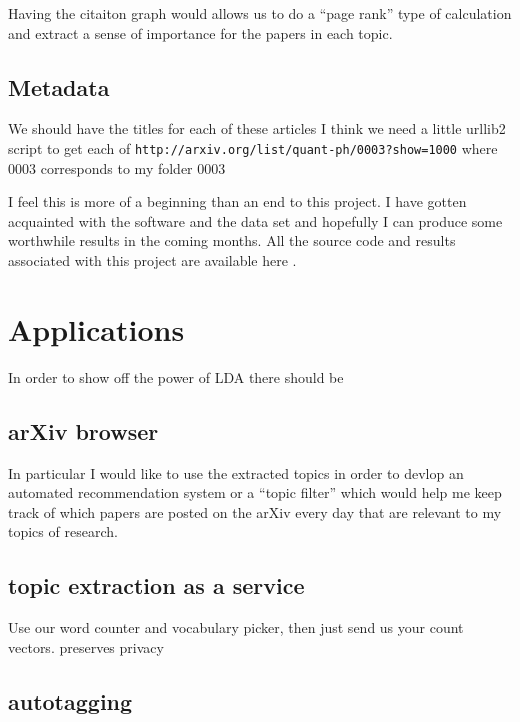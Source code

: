 \documentclass[letterpaper,12pt]{article}
\begin{document}
        Having the citaiton graph would allows us to do a ``page rank'' type of calculation
        and extract a sense of importance for the papers in each topic.


    \subsection{Metadata}
        We should have the titles for each of these articles I think
        we need a little urllib2 script to get each of
        \verb|http://arxiv.org/list/quant-ph/0003?show=1000|
        where 0003 corresponds to my folder 0003 


    
    \vspace{0.3in}

    I feel this is more of a beginning than an end to this project.
    I have gotten acquainted with the software and the data set and hopefully I can produce
    some worthwhile results in the coming months.
    All the source code and results associated with this project are available here \cite{IvanCode}.


\section{Applications}

	In order to show off the power of LDA there should be
	
	\subsection{arXiv browser}
	
	    In particular I would like to use the extracted topics in order to devlop an automated
	    recommendation system or a ``topic filter'' which would help me keep track of which papers
	    are posted on the arXiv every day that are relevant to my topics of research.

	\subsection{topic extraction as a service}
	
		Use our word counter and vocabulary picker, then just send us your count vectors.
		preserves privacy


	\subsection{autotagging}
	
\end{document}
